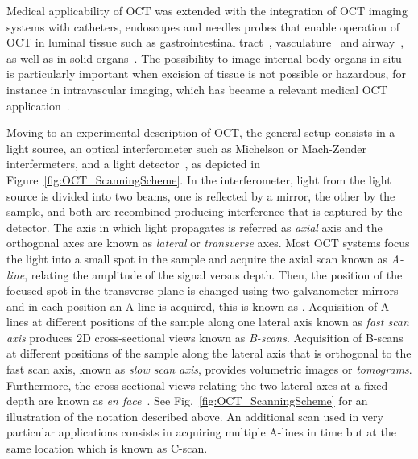 Medical applicability of OCT was extended with the integration of OCT imaging systems with catheters, endoscopes and needles probes that enable operation of OCT in luminal tissue such as gastrointestinal tract~\cite{Jackle2000_Vivo}, vasculature~\cite{Tearney1996_CatheterBased} and airway~\cite{Armstrong2003_Vivo}, as well as in solid organs~\cite{McLaughlin2012_Imaging}. The possibility to image internal body organs in situ is particularly important when excision of tissue is not possible or hazardous, for instance in intravascular imaging, which has became a relevant medical OCT application~\cite{Bouma2017_Intravascular}.

Moving to an experimental description of OCT, the general setup consists in a light source, an optical interferometer such as Michelson or Mach-Zender interfermeters, and a light detector~\cite{Huang1991_Optical}, as depicted in Figure~\ref{fig:OCT_ScanningScheme}. In the interferometer, light from the light source is divided into two beams, one is reflected by a mirror, the other by the sample, and both are recombined producing interference that is captured by the detector. The axis in which light propagates is referred as \textit{axial} axis and the orthogonal axes are known as \textit{lateral} or \textit{transverse} axes. Most OCT systems focus the light into a small spot in the sample and acquire the axial scan known as \textit{A-line}, relating the amplitude of the signal versus depth. Then, the position of the focused spot in the transverse plane is changed using two galvanometer mirrors and in each position an A-line is acquired, this is known as . Acquisition of A-lines at different positions of the sample along one lateral axis known as \textit{fast scan axis} produces 2D cross-sectional views known as \textit{B-scans}. Acquisition of B-scans at different positions of the sample along the lateral axis that is orthogonal to the fast scan axis, known as \textit{slow scan axis}, provides volumetric images or \textit{tomograms}. Furthermore, the cross-sectional views relating the two lateral axes at a fixed depth are known as \textit{en face}~\cite{Fujimoto2015_Introduction}. See Fig.~\ref{fig:OCT_ScanningScheme} for an illustration of the notation described above. An additional scan used in very particular applications consists in acquiring multiple A-lines in time but at the same location which is known as C-scan. 

